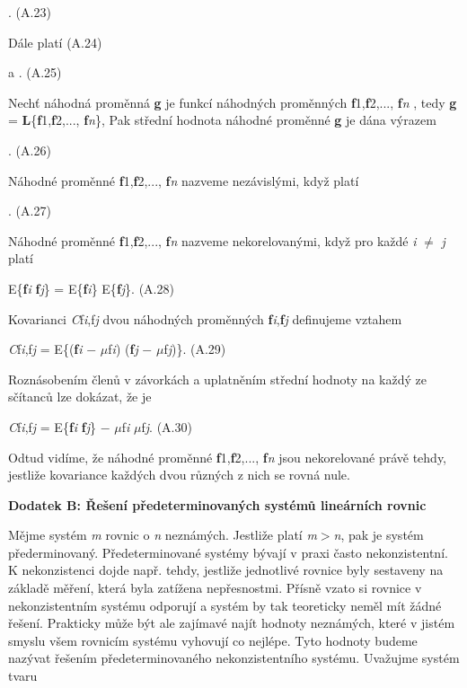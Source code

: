  . (A.23)

\noindent Dále platí  (A.24)

\noindent a . (A.25)

\noindent Nechť náhodná proměnná \textbf{g} je funkcí náhodných proměnných \textbf{f}1,\textbf{f}2,..., \textbf{f}\textit{n} , tedy \textbf{ g} = \textbf{L}\{\textbf{f}1,\textbf{f}2,..., \textbf{f}\textit{n}\}, Pak střední hodnota náhodné proměnné \textbf{g} je dána výrazem

 . (A.26)

\noindent Náhodné proměnné \textbf{f}1,\textbf{f}2,..., \textbf{f}\textit{n} nazveme nezávislými, když platí

 . (A.27)

\noindent Náhodné proměnné \textbf{f}1,\textbf{f}2,..., \textbf{f}\textit{n} nazveme nekorelovanými, když pro každé  \textit{i} $\neq$ \textit{j} platí

 E\{\textbf{f}\textit{i} \textbf{f}\textit{j}\} = E\{\textbf{f}\textit{i}\} E\{\textbf{f}\textit{j}\}. (A.28)

\noindent Kovarianci \textit{C}f\textit{i},f\textit{j} dvou náhodných proměnných \textbf{f}\textit{i},\textbf{f}\textit{j} definujeme vztahem

 \textit{C}f\textit{i},f\textit{j} = E\{(\textbf{f}\textit{i} $-$ $\mu$f\textit{i}) (\textbf{f}\textit{j} $-$ $\mu$f\textit{j})\}. (A.29)

\noindent Roznásobením členů v závorkách a uplatněním střední hodnoty na každý ze sčítanců lze dokázat, že je 

 \textit{C}f\textit{i},f\textit{j} = E\{\textbf{f}\textit{i} \textbf{f}\textit{j}\} $-$ $\mu$f\textit{i} $\mu$f\textit{j}. (A.30)

\noindent Odtud vidíme, že náhodné proměnné \textbf{f}1,\textbf{f}2,..., \textbf{f}\textit{n} jsou nekorelované právě tehdy, jestliže kovariance každých dvou různých z nich se rovná nule.

\noindent \textbf{Dodatek B:  Řešení předeterminovaných systémů lineárních rovnic}

\noindent Mějme systém \textit{m} rovnic o \textit{n} neznámých. Jestliže platí \textit{m}$>$\textit{n}, pak je systém přederminovaný. Předeterminované systémy bývají v praxi často nekonzistentní. K nekonzistenci dojde např. tehdy, jestliže jednotlivé rovnice byly sestaveny na základě měření, která byla zatížena nepřesnostmi. Přísně vzato si rovnice v nekonzistentním systému odporují a systém by tak teoreticky neměl mít žádné řešení. Prakticky může být ale zajímavé najít hodnoty neznámých, které v jistém smyslu všem rovnicím systému vyhovují co nejlépe. Tyto hodnoty budeme nazývat řešením předeterminovaného nekonzistentního systému. Uvažujme systém tvaru

